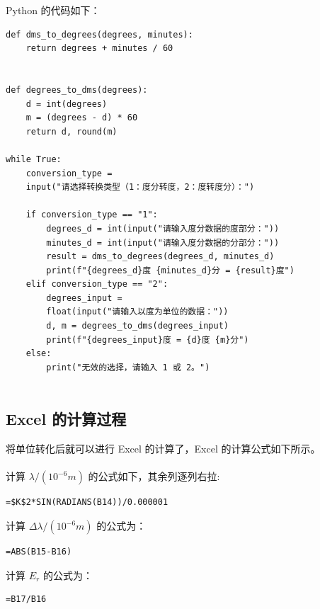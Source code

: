 \documentclass[12pt]{article}
\begin{document}
Python 的代码如下：
\begin{Verbatim}[frame=single, fontsize=\small]
def dms_to_degrees(degrees, minutes):
    return degrees + minutes / 60


def degrees_to_dms(degrees):
    d = int(degrees)
    m = (degrees - d) * 60
    return d, round(m)

while True:
    conversion_type = 
    input("请选择转换类型（1：度分转度，2：度转度分）：")

    if conversion_type == "1":
        degrees_d = int(input("请输入度分数据的度部分："))
        minutes_d = int(input("请输入度分数据的分部分："))
        result = dms_to_degrees(degrees_d, minutes_d)
        print(f"{degrees_d}度 {minutes_d}分 = {result}度")
    elif conversion_type == "2":
        degrees_input = 
        float(input("请输入以度为单位的数据："))
        d, m = degrees_to_dms(degrees_input)
        print(f"{degrees_input}度 = {d}度 {m}分")
    else:
        print("无效的选择，请输入 1 或 2。")
        
\end{Verbatim}
\subsection{\normalfont Excel 的计算过程}
将单位转化后就可以进行 Excel 的计算了，Excel 的计算公式如下所示。
\\\\
计算 $\lambda /(10^{-6}m)$ 的公式如下，其余列逐列右拉:

\begin{Verbatim}[frame=single, fontsize=\small]
    =$K$2*SIN(RADIANS(B14))/0.000001
\end{Verbatim}

计算 $\Delta \lambda /(10^{-6}m)$ 的公式为：
\begin{Verbatim}[frame=single, fontsize=\small]
    =ABS(B15-B16)
\end{Verbatim}

计算 $E_r$ 的公式为：
\begin{Verbatim}[frame=single, fontsize=\small]
    =B17/B16
\end{Verbatim}
\end{document}
